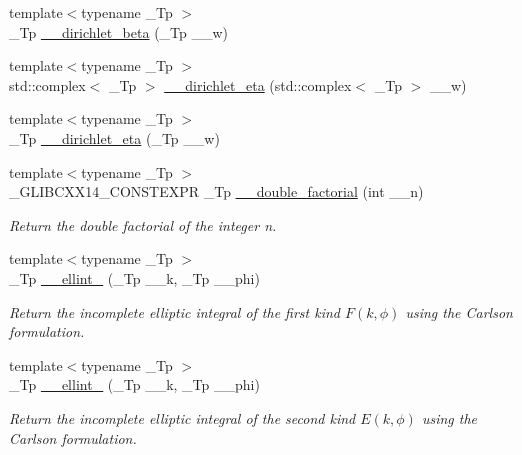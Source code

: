 \begin{DoxyCompactItemize}
\item 
{\footnotesize template$<$typename \+\_\+\+Tp $>$ }\\\+\_\+\+Tp \hyperlink{namespacestd_1_1____detail_a6cedea78253fd4d6da481c681a2eed72}{\+\_\+\+\_\+dirichlet\+\_\+beta} (\+\_\+\+Tp \+\_\+\+\_\+w)
\item 
{\footnotesize template$<$typename \+\_\+\+Tp $>$ }\\std\+::complex$<$ \+\_\+\+Tp $>$ \hyperlink{namespacestd_1_1____detail_ac00ca43b3035da757d982b43d2c59bc1}{\+\_\+\+\_\+dirichlet\+\_\+eta} (std\+::complex$<$ \+\_\+\+Tp $>$ \+\_\+\+\_\+w)
\item 
{\footnotesize template$<$typename \+\_\+\+Tp $>$ }\\\+\_\+\+Tp \hyperlink{namespacestd_1_1____detail_acd1e2a576d04658c6332df91cdaacd6e}{\+\_\+\+\_\+dirichlet\+\_\+eta} (\+\_\+\+Tp \+\_\+\+\_\+w)
\item 
{\footnotesize template$<$typename \+\_\+\+Tp $>$ }\\\+\_\+\+G\+L\+I\+B\+C\+X\+X14\+\_\+\+C\+O\+N\+S\+T\+E\+X\+P\+R \+\_\+\+Tp \hyperlink{namespacestd_1_1____detail_a06b0d9786afff0919c96f61d5f760c5f}{\+\_\+\+\_\+double\+\_\+factorial} (int \+\_\+\+\_\+n)
\begin{DoxyCompactList}\small\item\em Return the double factorial of the integer n. \end{DoxyCompactList}\item 
{\footnotesize template$<$typename \+\_\+\+Tp $>$ }\\\+\_\+\+Tp \hyperlink{namespacestd_1_1____detail_aa349fe5bcf36d29cfacf6cd3e8aa65b0}{\+\_\+\+\_\+ellint\+\_} (\+\_\+\+Tp \+\_\+\+\_\+k, \+\_\+\+Tp \+\_\+\+\_\+phi)
\begin{DoxyCompactList}\small\item\em Return the incomplete elliptic integral of the first kind $ F(k,\phi) $ using the Carlson formulation. \end{DoxyCompactList}\item 
{\footnotesize template$<$typename \+\_\+\+Tp $>$ }\\\+\_\+\+Tp \hyperlink{namespacestd_1_1____detail_ad3687a38e74e5fbf08265501add0b56a}{\+\_\+\+\_\+ellint\+\_} (\+\_\+\+Tp \+\_\+\+\_\+k, \+\_\+\+Tp \+\_\+\+\_\+phi)
\begin{DoxyCompactList}\small\item\em Return the incomplete elliptic integral of the second kind $ E(k,\phi) $ using the Carlson formulation. \end{DoxyCompactList}\item 

\end{DoxyCompactItemize}
